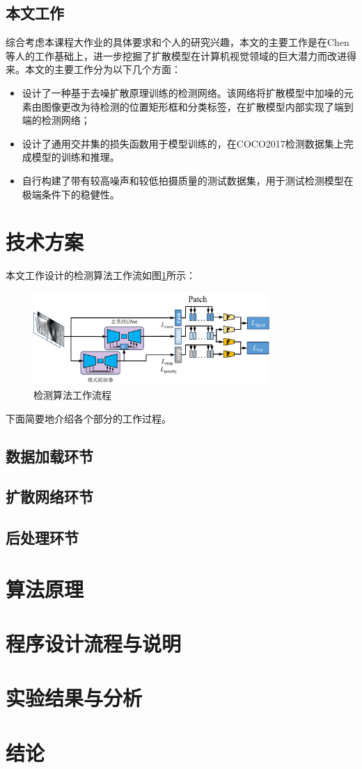 \documentclass[11pt]{article}
\begin{document}
\subsection{本文工作}
综合考虑本课程大作业的具体要求和个人的研究兴趣，本文的主要工作是在Chen\cite{chenDiffusionDetDiffusionModel2023}等人的工作基础上，进一步挖掘了扩散模型\cite{hoDenoisingDiffusionProbabilistic2020}在计算机视觉领域的巨大潜力而改进得来。本文的主要工作分为以下几个方面：
\begin{itemize}
  \item 设计了一种基于去噪扩散原理训练的检测网络。该网络将扩散模型中加噪的元素由图像更改为待检测的位置矩形框和分类标签，在扩散模型内部实现了端到端的检测网络；
  \item 设计了通用交并集的损失函数用于模型训练的，在COCO2017\cite{linMicrosoftCOCOCommon2014}检测数据集上完成模型的训练和推理。
  \item 自行构建了带有较高噪声和较低拍摄质量的测试数据集，用于测试检测模型在极端条件下的稳健性。
\end{itemize}
\section{技术方案}
本文工作设计的检测算法工作流如图\ref{fig:workflow}所示：
\begin{figure}[H]
  \centering
  \includegraphics[width=0.8\textwidth]{workflow.png}
  \caption{检测算法工作流程}
  \label{fig:workflow}
\end{figure}
下面简要地介绍各个部分的工作过程。
\subsection{数据加载环节}

\subsection{扩散网络环节}

\subsection{后处理环节}

\section{算法原理}

\section{程序设计流程与说明}

\section{实验结果与分析}

\section{结论}

\newpage
\printbibliography[heading=bibliography,title=参考文献]
\end{document}
